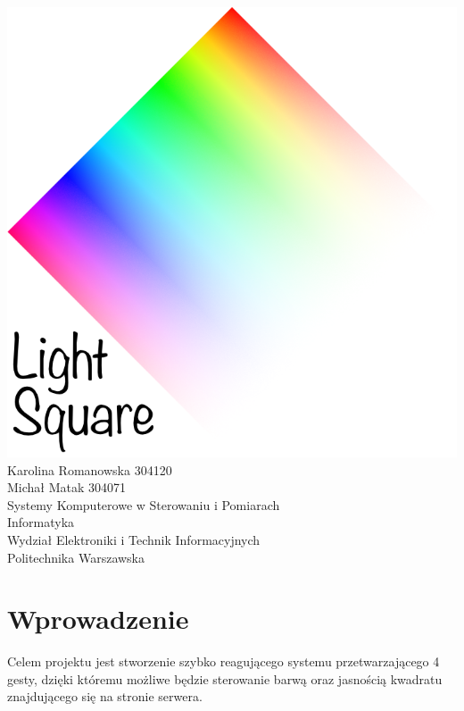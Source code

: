 \documentclass{article}
\begin{document}
\begin{titlepage}
    \begin{center}
 
        
 
 
        \vspace{0.8cm}
		\includegraphics[width=\textwidth]{LightText2.png} 
 		\vfill
        \Large
        Karolina Romanowska 304120\\
        Michał Matak 304071\\
        Systemy Komputerowe w Sterowaniu i Pomiarach\\
        Informatyka\\
        Wydział Elektroniki i Technik Informacyjnych\\
        Politechnika Warszawska\\
 
    \end{center}
\end{titlepage}
\section{Wprowadzenie}
Celem projektu jest stworzenie szybko reagującego systemu przetwarzającego 4 gesty, dzięki któremu możliwe będzie sterowanie barwą oraz jasnością kwadratu znajdującego się na stronie serwera.
\end{document}
